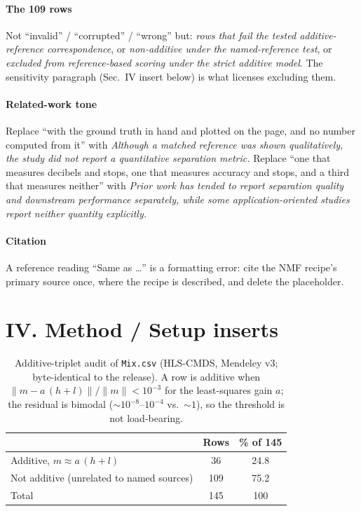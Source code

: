 \documentclass[conference]{IEEEtran}
\begin{document}
\paragraph{The 109 rows}
Not ``invalid'' / ``corrupted'' / ``wrong'' but: \emph{rows that fail the tested additive-reference correspondence}, or \emph{non-additive under the named-reference test}, or \emph{excluded from reference-based scoring under the strict additive model}. The sensitivity paragraph (Sec.~IV insert below) is what licenses excluding them.

\paragraph{Related-work tone}
Replace ``with the ground truth in hand and plotted on the page, and no number computed from it'' with \emph{Although a matched reference was shown qualitatively, the study did not report a quantitative separation metric.} Replace ``one that measures decibels and stops, one that measures accuracy and stops, and a third that measures neither'' with \emph{Prior work has tended to report separation quality and downstream performance separately, while some application-oriented studies report neither quantity explicitly.}

\paragraph{Citation}
A reference reading ``Same as \ldots'' is a formatting error: cite the NMF recipe's primary source once, where the recipe is described, and delete the placeholder.

\section*{IV. Method / Setup inserts}

\begin{table}[htbp]
\centering
\caption{Additive-triplet audit of \texttt{Mix.csv} (HLS-CMDS, Mendeley v3; byte-identical to the release). A row is additive when $\|m - a\,(h+l)\|/\|m\| < 10^{-3}$ for the least-squares gain $a$; the residual is bimodal ($\sim10^{-8}$--$10^{-4}$ vs.\ $\sim1$), so the threshold is not load-bearing.}
\label{pi:additive}
\footnotesize
\begin{tabular}{@{}lcc@{}}
\toprule
 & Rows & \% of 145 \\
\midrule
Additive, $m \approx a\,(h+l)$ & 36 & 24.8 \\
Not additive (unrelated to named sources) & 109 & 75.2 \\
\midrule
Total & 145 & 100 \\
\bottomrule
\end{tabular}
\end{table}
\end{document}
